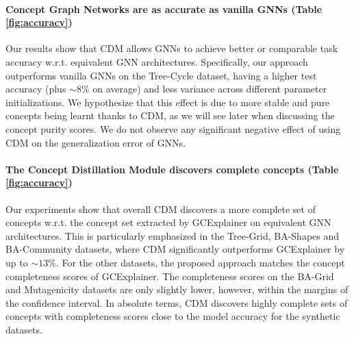 \paragraph{Concept Graph Networks are as accurate as vanilla GNNs (Table \ref{fig:accuracy})}
Our results show that CDM allows GNNs to achieve better or comparable task accuracy w.r.t. equivalent GNN architectures. Specifically, our approach outperforms vanilla GNNs on the Tree-Cycle dataset, having a higher test accuracy (plus $\sim 8\%$ on average) and less variance across different parameter initializations. We hypothesize that this effect is due to more stable and pure concepts being learnt thanks to CDM, as we will see later when discussing the concept purity scores. We do not observe any significant negative effect of using CDM on the generalization error of GNNs.


\paragraph{The Concept Distillation Module discovers complete concepts (Table \ref{fig:accuracy})}
Our experiments show that overall CDM discovers a more complete set of concepts w.r.t. the concept set extracted by GCExplainer on equivalent GNN architectures. This is particularly emphasized in the Tree-Grid, BA-Shapes and BA-Community datasets, where CDM significantly outperforms GCExplainer by up to $\sim 13\%$. For the other datasets, the proposed approach matches the concept completeness scores of GCExplainer. The completeness scores on the BA-Grid and Mutagenicity datasets are only slightly lower, however, within the margins of the confidence interval. In absolute terms, CDM discovers highly complete sets of concepts with completeness scores close to the model accuracy for the synthetic datasets. 


